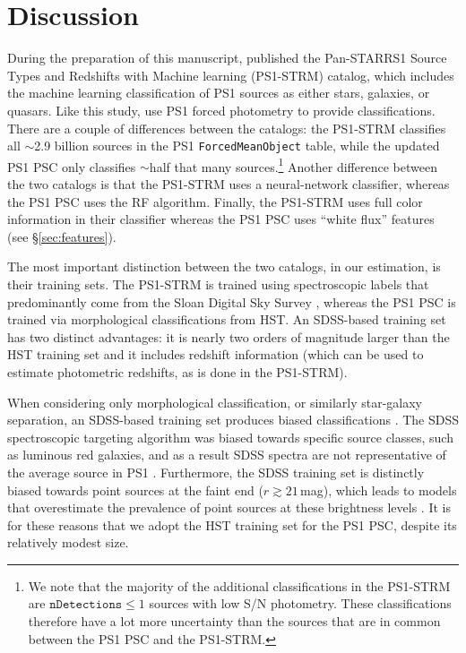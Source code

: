 \documentclass[twocolumn]{aastex63}
\begin{document}
\section{Discussion}

During the preparation of this manuscript, \citet{Beck20} published the
Pan-STARRS1 Source Types and Redshifts with Machine learning (PS1-STRM)
catalog, which includes the machine learning classification of PS1 sources as
either stars, galaxies, or quasars. Like this study, \citet{Beck20} use PS1
forced photometry to provide classifications. There are a couple of
differences between the catalogs: the PS1-STRM classifies all $\sim$2.9
billion sources in the PS1 \texttt{ForcedMeanObject} table, while the updated
PS1 PSC only classifies $\sim$half that many sources.\footnote{We note that
the majority of the additional classifications in the PS1-STRM are
$\mathtt{nDetections} \le 1$ sources with low S/N photometry. These
classifications therefore have a lot more uncertainty than the sources that
are in common between the PS1 PSC and the PS1-STRM.} Another difference
between the two catalogs is that the PS1-STRM uses a neural-network
classifier, whereas the PS1 PSC uses the RF algorithm. Finally, the PS1-STRM
uses full color information in their classifier whereas the PS1 PSC uses
``white flux'' features (see \S\ref{sec:features}).

The most important distinction between the two catalogs, in our estimation, is
their training sets. The PS1-STRM is trained using spectroscopic labels that
predominantly come from the Sloan Digital Sky Survey
\citet[SDSS][]{Abolfathi18}, whereas the PS1 PSC is trained via morphological
classifications from HST. An SDSS-based training set has two distinct
advantages: it is nearly two orders of magnitude larger than the HST training
set and it includes redshift information (which can be used to estimate
photometric redshifts, as is done in the PS1-STRM).

When considering only morphological classification, or similarly star-galaxy
separation, an SDSS-based training set produces biased classifications
\citep{Tachibana18}. The SDSS spectroscopic targeting algorithm was biased
towards specific source classes, such as luminous red galaxies, and as a
result SDSS spectra are not representative of the average source in PS1
\citep[see Figure~1 in][]{Tachibana18}. Furthermore, the SDSS training set is
distinctly biased towards point sources at the faint end ($r \gtrsim
21$\,mag), which leads to models that overestimate the prevalence of point
sources at these brightness levels \citep[see e.g., Figure~7
in][]{Tachibana18}. It is for these reasons that we adopt the HST training set
for the PS1 PSC, despite its relatively modest size.
\end{document}
